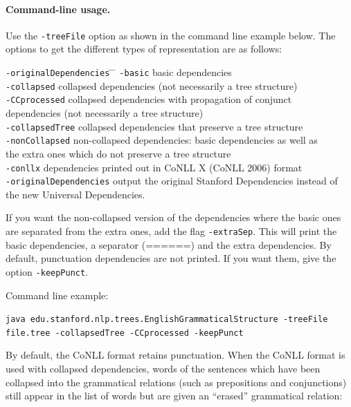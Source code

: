 \documentclass[11pt,letterpaper]{article}
\begin{document}
\paragraph{Command-line usage.} Use the \texttt{-treeFile} option as shown in the command line example below. The options to get the different types of representation are as follows:
\begin{tabbing}
\hspace{.3cm} \= \texttt{-originalDependencies} \= \hspace{.3cm} \= \kill
\> \texttt{-basic} \>\> basic dependencies\\
\> \texttt{-collapsed} \>\> collapsed dependencies (not necessarily a tree structure)\\
\> \texttt{-CCprocessed} \>\> collapsed dependencies with propagation of conjunct \\
\> \> \> dependencies (not necessarily a tree structure)\\
\> \texttt{-collapsedTree} \>\> collapsed dependencies that preserve a tree structure\\
\> \texttt{-nonCollapsed} \>\> non-collapsed dependencies: basic dependencies as well as\\
\> 						 \>\> the extra ones which do not preserve a tree structure\\
\> \texttt{-conllx} \>\> dependencies printed out in CoNLL X (CoNLL 2006) format \\
\> \texttt{-originalDependencies} \>\> output the original Stanford Dependencies instead of \\
\>                                            \>\> the new Universal Dependencies.
\end{tabbing}

\noindent If you want the non-collapsed version of the dependencies where the basic ones are separated from the extra ones, add the flag \texttt{-extraSep}. This will print the basic dependencies, a separator (======) and the extra dependencies.
By default, punctuation dependencies are not printed.  If you want
them, give the option \texttt{-keepPunct}.

\bigskip

\noindent Command line example:\\
{\hangindent=0.5in\raggedright\texttt{java  edu.stanford.nlp.trees.EnglishGrammaticalStructure -treeFile
    file.tree -collapsedTree -CCprocessed -keepPunct} \\}

\vspace*{.4cm}
\noindent By default, the CoNLL format retains punctuation. When the
CoNLL format is used with collapsed dependencies, words of the
sentences which have been collapsed into the grammatical relations
(such as prepositions and conjunctions) still appear in the list of
words but are given an ``erased'' grammatical relation:
\end{document}
